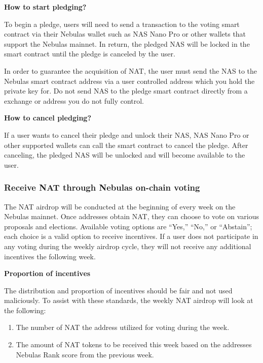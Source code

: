 \vspace{2em}

\textbf{How to start pledging?} 
	
To begin a pledge, users will need to send a transaction to the voting smart contract via their Nebulas wallet such as NAS Nano Pro or other wallets that support the Nebulas mainnet. In return, the pledged NAS will be locked in the smart contract until the pledge is canceled by the user.

In order to guarantee the acquisition of NAT, the user must send the NAS to the Nebulas smart contract address via a user controlled address which you hold the private key for. Do not send NAS to the pledge smart contract directly from a exchange or address you do not fully control.

\vspace{2em}

\textbf{How to cancel pledging?}

If a user wants to cancel their pledge and unlock their NAS, NAS Nano Pro or other supported wallets can call the smart contract to cancel the pledge. After canceling, the pledged NAS will be unlocked and will become available to the user.

\subsubsection{Receive NAT through Nebulas on-chain voting}

The NAT airdrop will be conducted at the beginning of every week on the Nebulas mainnet. Once addresses obtain NAT, they can choose to vote on various proposals and elections. Available voting options are “Yes,” “No,” or “Abstain”; each choice is a valid option to receive incentives. If a user does not participate in any voting during the weekly airdrop cycle, they will not receive any additional incentives the following week.

\vspace{2em}

\textbf{Proportion of incentives}

The distribution and proportion of incentives should be fair and not used maliciously. To assist with these standards, the weekly NAT airdrop will look at the following:

\begin{enumerate}
	\item The number of NAT the address utilized for voting during the week.
	\item The amount of NAT tokens to be received this week based on the addresses Nebulas Rank score from the previous week.
\end{enumerate}

